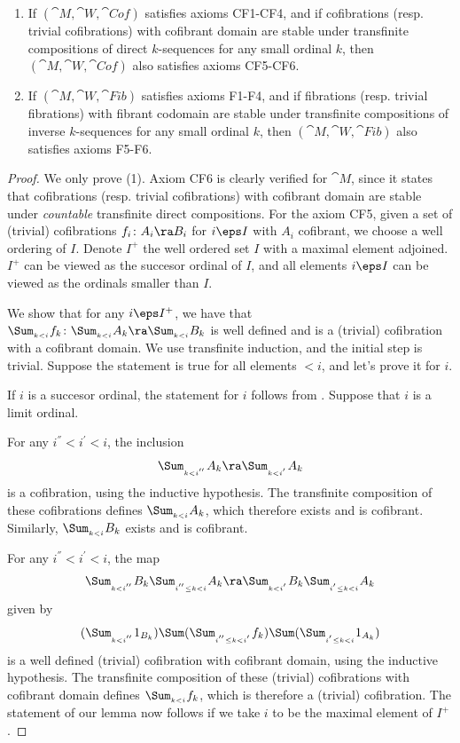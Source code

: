 \begin{lem}
\label{lem:transfinitecompositionstability}
\mbox{}
\begin{enumerate}
\item
If $({\cat M}, {\cat W}, {\cat Cof})$ satisfies axioms CF1-CF4, and if cofibrations (resp. trivial cofibrations) with cofibrant domain are stable under transfinite compositions of direct $k$-sequences for any small ordinal $k$, then $({\cat M}, {\cat W}, {\cat Cof})$ also satisfies axioms CF5-CF6.
\item
If $({\cat M}, {\cat W}, {\cat Fib})$ satisfies axioms F1-F4, and if fibrations (resp. trivial fibrations) with fibrant codomain are stable under transfinite compositions of inverse $k$-sequences for any small ordinal $k$, then $({\cat M}, {\cat W}, {\cat Fib})$ also satisfies axioms F5-F6.
\end{enumerate}
\end{lem}

\begin{proof}
We only prove (1). Axiom CF6 is clearly verified for ${\cat M}$, since it states that cofibrations (resp. trivial cofibrations) with cofibrant domain are stable under {\it countable} transfinite direct compositions. For the axiom CF5, given a set of (trivial) cofibrations $f_i \colon A_i \ra B_i$ for $i \eps I$ with $A_i$ cofibrant, we choose a well ordering of $I$. Denote $I^+$ the well ordered set $I$ with a maximal element adjoined. $I^+$ can be viewed as the succesor ordinal of $I$, and all elements $i \eps I$ can be viewed as the ordinals smaller than $I$.

We show that for any $i \eps I^+$, we have that $\Sum_{_{k < i}} f_k \colon \Sum_{_{k < i}} A_k \ra \Sum_{_{k < i}} B_k$ is well defined and is a (trivial) cofibration with a cofibrant domain. We use transfinite induction, and the initial step is trivial. Suppose the statement is true for all elements $<i$, and let's prove it for $i$.

If $i$ is a succesor ordinal, the statement for $i$ follows from . Suppose that $i$ is a limit ordinal. 

For any $i^{''} < i^{'} < i$, the inclusion
\[
\Sum_{_{k < i^{''}}} A_k \ra \Sum_{_{k < i^{'}}} A_k
\]
is a cofibration, using the inductive hypothesis. The transfinite composition of these cofibrations defines $\Sum_{_{k < i}} A_k$, which therefore exists and is cofibrant. Similarly, $\Sum_{_{k < i}} B_k$ exists and is cofibrant.

For any $i^{''} < i^{'} < i$, the map
\[
\Sum_{_{k < i^{''}}} B_k \Sum_{_{i^{''} \le k < i}} A_k \ra \Sum_{_{k < i^{'}}} B_k \Sum_{_{i^{'} \le k < i}} A_k
\]
given by
\[
(\Sum_{_{k < i^{''}}} 1_{B_k}) \Sum (\Sum_{_{i^{''} \le k < i^{'}}} f_k) \Sum (\Sum_{_{i^{'} \le k < i}} 1_{A_k}) 
\]
is a well defined (trivial) cofibration with cofibrant domain, using the inductive hypothesis. The transfinite composition of these (trivial) cofibrations with cofibrant domain defines $\Sum_{_{k < i}} f_k$, which is therefore a (trivial) cofibration. The statement of our lemma now follows if we take $i$ to be the maximal element of $I^+$.
\end{proof}

